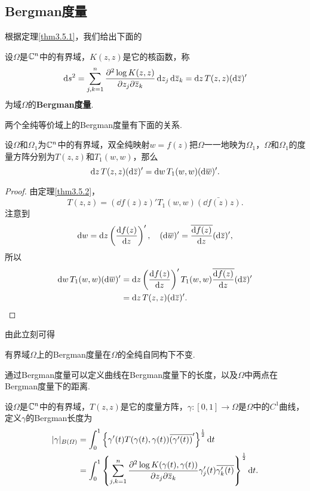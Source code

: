 \subsection{Bergman度量}
根据定理\ref{thm3.5.1}，我们给出下面的
\begin{definition}\label{def3.5.3}
	设$\Omega$是$\mathbb C^n$中的有界域，$K(z,z)$是它的核函数，称
	\[\mathop{}\!\mathrm{d} s^2=\sum_{j,k=1}^{n}\frac{\partial^2 \log K(z,z)}{\partial z_j\partial {}\mkern1mu\overline{\mkern-1muz}_k}\mathop{}\!\mathrm{d} z_j\mathop{}\!\mathrm{d} {}\mkern1mu\overline{\mkern-1muz}_k=\mathop{}\!\mathrm{d} z \, T(z,z) (\mathop{}\!\mathrm{d}{}\mkern1mu\overline{\mkern-1muz})'\]
	为域$\Omega$的\textbf{Bergman度量}.
\end{definition}
两个全纯等价域上的Bergman度量有下面的关系.
\begin{theorem}\label{thm3.5.4}
	设$\Omega$和$\Omega_1$为$\mathbb C^n$中的有界域，双全纯映射$w=f(z)$把$\Omega$一一地映为$\Omega_1$，$\Omega$和$\Omega_1$的度量方阵分别为$T(z,z)$和$T_1(w,w)$，那么
	\[\mathop{}\!\mathrm{d} z \, T(z,z)(\mathop{}\!\mathrm{d}{}\mkern1mu\overline{\mkern-1muz})'=\mathop{}\!\mathrm{d} w \, T_1(w,w)(\mathop{}\!\mathrm{d}{}\mkern1mu\overline{\mkern-1muw})'.\]
\end{theorem}
\begin{proof}
	由定理\ref{thm3.5.2}，
	\[T(z,z)=\left(\dd{f(z)}{z}\right)' T_1(w,w)\bar{\left(\dd{f(z)}{z}\right)}.\]
	注意到
	\[\dif w=\dif z\left(\dd{f(z)}{z}\right)',\quad (\dif\bar{w})'=\bar{\dd{f(z)}{z}}(\dif\bar{z})',\]
	所以
	\begin{align*}
		\dif w \, T_1(w,w)(\dif\bar{w})'
		&=\dif z\left(\dd{f(z)}{z}\right)' T_1(w,w)\bar{\dd{f(z)}{z}}(\dif\bar{z})'\\
		&=\dif z \, T(z,z)(\dif\bar{z})'.\qedhere
	\end{align*}
\end{proof}
由此立刻可得
\begin{corollary}\label{cor3.5.5}
	有界域$\Omega$上的Bergman度量在$\Omega$的全纯自同构下不变.
\end{corollary}
通过Bergman度量可以定义曲线在Bergman度量下的长度，以及$\Omega$中两点在Bergman度量下的距离.
\begin{definition}\label{def3.5.6}
	设$\Omega$是$\mathbb C^n$中的有界域，$T(z,z)$是它的度量方阵，$\gamma\colon[0,1]\to\Omega$是$\Omega$中的$C^1$曲线，定义$\gamma$的Bergman长度为
	\begin{align*}
		|\gamma|_{B(\varOmega)}
		&=\int_{0}^{1}\left\{\gamma'(t)T(\gamma(t),\gamma(t)){}\mkern1mu\overline{\mkern-1mu(\gamma'(t))}'\right\}^{\frac12}\mathop{}\!\mathrm{d} t\\
		&=\int_{0}^{1}\left\{\sum_{j,k=1}^{n}\frac{\partial^2 \log K(\gamma(t),\gamma(t))}{\partial z_j\partial {}\mkern1mu\overline{\mkern-1muz}_k}\gamma_j'(t){}\mkern1mu\overline{\mkern-1mu\gamma_k'(t)}\right\}^{\frac12}\mathop{}\!\mathrm{d} t.
	\end{align*}
\end{definition}
